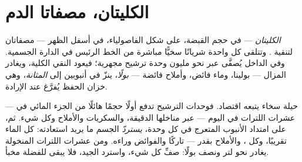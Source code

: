 \section{الكليتان، مصفاتا الدم}

\begin{definition}\label{def:g7:removing-wastes:kidneys}
\emph{الكليتان} --- في حجم القبضة، على شكل الفاصولياء،
في أسفل الظهر --- مصفاتان لتنقية . وتتلقى كل واحدة شريانًا
سخيًّا مباشرة من الخط الرئيس في الدارة الجسمية. وفي الداخل يُصفَّى
 عبر نحو مليون وحدة ترشيح مجهرية؛ فيعود  النقي 
الكلية، ويغادر  المزال --- بولينا، وماء فائض، وأملاح فائضة
--- \emph{بولًا}، ينزّ في أنبوبين إلى
\emph{المثانة}، وهي خزان الحفظ يُفرَّغ عند الإرادة.
\end{definition}

\begin{proposition}[صفِّ ثم استردّ]\label{prop:g7:removing-wastes:filter}
حيلة  سخاء يتبعه اقتصاد. فوحدات الترشيح تدفع أولًا حجمًا
هائلًا من الجزء المائي في  --- عشرات اللترات في اليوم --- عبر
مناخلها الدقيقة،  والسكريات والأملاح وكل شيء. ثم، على
امتداد الأنبوب المتعرج في كل وحدة، \emph{يستردّ} الجسم ما يريد
استعادته: كل الماء تقريبًا، وكل ، والأملاح بقدر --- تاركًا
 والفوائض وراءه. ومن عشرات اللترات المنخولة يغادر نحو لتر
ونصف بولًا: صفِّ كل شيء، واسترد الجيد، فلا يبقى للفضلة مخبأ.
\end{proposition}
\admitted

